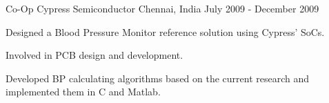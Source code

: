 \begin{cventries}
  \cventry
    {Co-Op}
    {Cypress Semiconductor}
    {Chennai, India}
    {July 2009 - December 2009}
    {
      \begin{cvitems}
        \item{Designed a Blood Pressure Monitor reference solution using Cypress' SoCs.}
        \item{Involved in PCB design and development.}
        \item{Developed BP calculating algorithms based on the current research and implemented them in C and Matlab.}
      \end{cvitems}
    }

\end{cventries}
